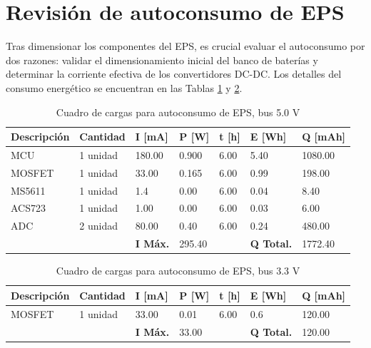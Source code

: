 \newpage

\section{Revisión de autoconsumo de EPS}

Tras dimensionar los componentes del EPS, es crucial evaluar el autoconsumo por dos razones: validar el dimensionamiento inicial del banco de baterías y determinar la corriente efectiva de los convertidores DC-DC. Los detalles del consumo energético se encuentran en las Tablas \ref{tab:autoconsumo50_EPS} y \ref{tab:autoconsumo33_EPS}.




\begin{table}[!ht]
    \centering
    \renewcommand{\arraystretch}{1.2}
    \caption{Cuadro de cargas para autoconsumo de EPS, bus 5.0 V}
    \label{tab:autoconsumo50_EPS}
    \begin{tabularx}{1.1\textwidth}{lllllll}
    \hline
    \textbf{Descripción} & \textbf{Cantidad} & \textbf{I [mA]} & \textbf{P [W]} & \textbf{t [h]} & \textbf{E [Wh]} & \textbf{Q [mAh]} \\
    \hline
    MCU & 1 unidad & 180.00 & 0.900 & 6.00 & 5.40 & 1080.00 \\ 
    MOSFET & 1 unidad & 33.00 & 0.165 & 6.00 & 0.99 & 198.00  \\ 
    MS5611 & 1 unidad & 1.4 & 0.00 & 6.00 & 0.04 & 8.40  \\ 
    ACS723 & 1 unidad & 1.00 & 0.00& 6.00 & 0.03& 6.00  \\ 
    ADC & 2 unidad & 80.00 & 0.40 & 6.00 & 0.24 & 480.00 \\
    \hline
    & & \textbf{I Máx.} & 295.40 & &\textbf{Q Total.} & 1772.40 \\ 
    \hline
    \end{tabularx}
\end{table}


\begin{table}[!ht]
    \centering
    \renewcommand{\arraystretch}{1.2}
    \caption{Cuadro de cargas para autoconsumo de EPS, bus 3.3 V}
    \label{tab:autoconsumo33_EPS}
    \begin{tabularx}{1.1\textwidth}{lllllll}
    \hline
    \textbf{Descripción} & \textbf{Cantidad} & \textbf{I [mA]} & \textbf{P [W]} & \textbf{t [h]} & \textbf{E [Wh]} & \textbf{Q [mAh]} \\
    \hline
    MOSFET & 1 unidad & 33.00 & 0.01 & 6.00 & 0.6 & 120.00 \\
    \hline
    & & \textbf{I Máx.} & 33.00 & &\textbf{Q Total.} & 120.00 \\ 
    \hline
    \end{tabularx}
\end{table}

